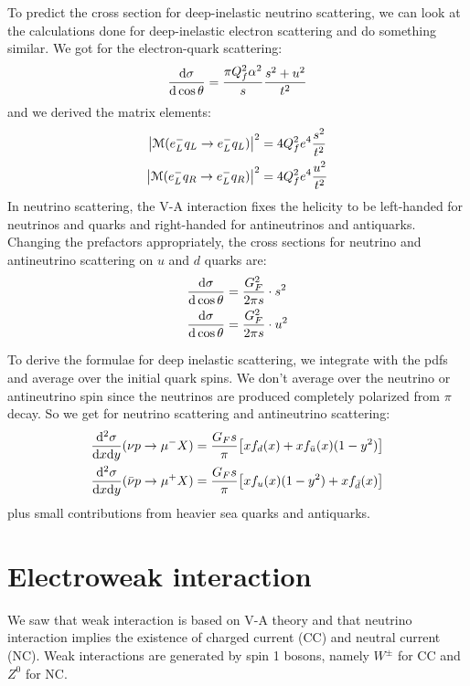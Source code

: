 \documentclass[../../main/main.tex]{subfiles}
\begin{document}
To predict the cross section for deep-inelastic neutrino scattering, we can look at the calculations done for deep-inelastic electron scattering and do something similar. We got for the electron-quark scattering:
\begin{equation}
	\dv{\sigma}{\cos \theta}
	=
	\frac{\pi Q_f^2 \alpha^2}{s} \frac{s^2 + u^2}{t^2}
	\label{eq:}
\end{equation}
and we derived the matrix elements:
\begin{align}
	\abs{\mathcal{M}(e^-_L q_L \rightarrow e^-_L q_L)}^2
	&=
	4 Q^2_f e^4 \frac{s^2}{t^2}	\\
	\abs{\mathcal{M}(e^-_L q_R \rightarrow e^-_L q_R)}^2
	&=
	4 Q^2_f e^4 \frac{u^2}{t^2}
\end{align}
In neutrino scattering, the V-A interaction fixes the helicity to be left-handed for neutrinos and quarks and right-handed for antineutrinos and antiquarks. Changing the prefactors appropriately, the cross sections for neutrino and antineutrino scattering on \( u \) and \( d \) quarks are:
\begin{align}
	\dv{\sigma}{\cos \theta} (\nu_L d_L \rightarrow \mu^-_L u_L)
	&=
	\frac{G^2_F}{2\pi s} \cdot s^2	\\
	\dv{\sigma}{\cos \theta} (\bar{\nu}_R d_L \rightarrow \mu^+_R u_L)
	&=
	\frac{G^2_F}{2\pi s} \cdot u^2
\end{align}

To derive the formulae for deep inelastic scattering, we integrate with the pdfs and average over the initial quark spins. We don't average over the neutrino or antineutrino spin since the neutrinos are produced completely polarized from \( \pi \) decay. So we get for neutrino scattering and antineutrino scattering:
\begin{align}
	\frac{\mathrm{d}{^2 \sigma}}{\mathrm{d}{x} \mathrm{d}{y}}(\nu p \rightarrow \mu^- X)
	&=
	\frac{G_F s}{\pi} \qty[x f_d(x) + x f_{\bar{u}}(x)(1-y^2)]	\\
	\frac{\mathrm{d}{^2 \sigma}}{\mathrm{d}{x} \mathrm{d}{y}}(\bar{\nu} p \rightarrow \mu^+ X)
	&=
	\frac{G_F s}{\pi} \qty[x f_u(x)(1-y^2) + x f_{\bar{d}}(x)]
\end{align}
plus small contributions from heavier sea quarks and antiquarks.





\section{Electroweak interaction}
We saw that weak interaction is based on V-A theory and that neutrino interaction implies the existence of charged current (CC) and neutral current (NC). Weak interactions are generated by spin 1 bosons, namely \( W^{\pm} \) for CC and \( Z^0 \) for NC.
\end{document}
